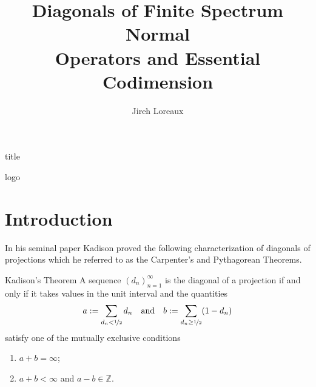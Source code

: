 \documentclass{article}
\begin{document}

\setmainfont{Linux Libertine}
\setsansfont{DejaVu Sans}
\LARGE\sffamily
{}


\begin{staticcontents*}{title}
  \title{Diagonals of Finite Spectrum Normal \\ Operators and Essential Codimension}
  \author{Jireh Loreaux}
  \maketitle
\end{staticcontents*}


\begin{staticcontents*}{logo}
\end{staticcontents*}


\section*{Introduction}

In his seminal paper Kadison proved the following characterization of diagonals of projections which he referred to as the Carpenter's and Pythagorean Theorems.

\begin{thmcustom}{Kadison's Theorem}
  A sequence $(d_n)_{n=1}^{\infty}$ is the diagonal of a projection if and only if it takes values in the unit interval and the quantities
  \begin{equation*}
    a := \sum_{d_n < \nicefrac{1}{2}} d_n \quad\text{and}\quad b := \sum_{d_n \ge \nicefrac{1}{2}} (1-d_n)
  \end{equation*}
  satisfy one of the mutually exclusive conditions
  \begin{enumerate}
  \item $a+b = \infty$;
  \item $a+b < \infty$ and $a-b \in \mathbb{Z}$.
  \end{enumerate}
\end{thmcustom}
\end{document}
